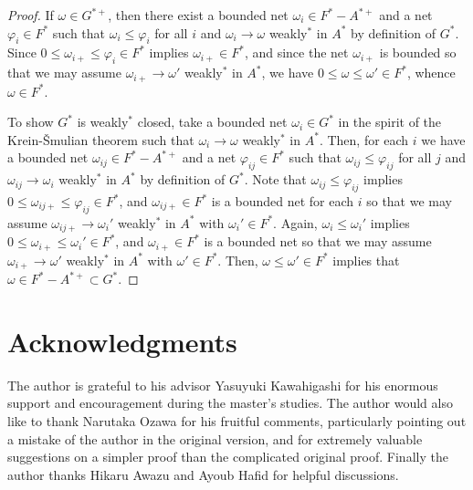 \documentclass[11pt]{amsart}
\theoremstyle{plain}
\theoremstyle{definition}
\begin{document}
\begin{proof}
If $\omega\in G^{*+}$, then there exist a bounded net $\omega_i\in F^*-A^{*+}$ and a net $\varphi_i\in F^*$ such that $\omega_i\le\varphi_i$ for all $i$ and $\omega_i\to\omega$ weakly$^*$ in $A^*$ by definition of $G^*$.
Since $0\le\omega_{i+}\le\varphi_i\in F^*$ implies $\omega_{i+}\in F^*$, and since the net $\omega_{i+}$ is bounded so that we may assume $\omega_{i+}\to\omega'$ weakly$^*$ in $A^*$, we have $0\le\omega\le\omega'\in F^*$, whence $\omega\in F^*$.

To show $G^*$ is weakly$^*$ closed, take a bounded net $\omega_i\in G^*$ in the spirit of the Krein-\v Smulian theorem such that $\omega_i\to\omega$ weakly$^*$ in $A^*$.
Then, for each $i$ we have a bounded net $\omega_{ij}\in F^*-A^{*+}$ and a net $\varphi_{ij}\in F^*$ such that $\omega_{ij}\le\varphi_{ij}$ for all $j$ and $\omega_{ij}\to\omega_i$ weakly$^*$ in $A^*$ by definition of $G^*$.
Note that $\omega_{ij}\le\varphi_{ij}$ implies $0\le\omega_{ij+}\le\varphi_{ij}\in F^*$, and $\omega_{ij+}\in F^*$ is a bounded net for each $i$ so that we may assume $\omega_{ij+}\to\omega_i'$ weakly$^*$ in $A^*$ with $\omega_i'\in F^*$.
Again, $\omega_i\le\omega_i'$ implies $0\le\omega_{i+}\le\omega_i'\in F^*$, and $\omega_{i+}\in F^*$ is a bounded net so that we may assume $\omega_{i+}\to\omega'$ weakly$^*$ in $A^*$ with $\omega'\in F^*$.
Then, $\omega\le\omega'\in F^*$ implies that $\omega\in F^*-A^{*+}\subset G^*$.
\end{proof}

\section*{Acknowledgments}
The author is grateful to his advisor Yasuyuki Kawahigashi for his enormous support and encouragement during the master's studies.
The author would also like to thank Narutaka Ozawa for his fruitful comments, particularly pointing out a mistake of the author in the original version, and for extremely valuable suggestions on a simpler proof than the complicated original proof.
Finally the author thanks Hikaru Awazu and Ayoub Hafid for helpful discussions.



\end{document}

